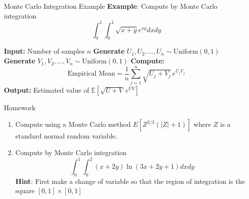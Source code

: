 \documentclass[8pt]{beamer}
\begin{document}
\begin{frame}[fragile]{Monte Carlo Integration Example}
\textbf{Example}: Compute by Monte Carlo integration 
\begin{equation*}
	\int_0^1 \int_0^1 \sqrt{x+y} e^{xy} dxdy
\end{equation*}

\begin{algorithm}[H]
\caption{Monte Carlo Estimator for $\mathbb{E}\!\left[\sqrt{U+V}\, e^{UV}\right]$}
\begin{algorithmic}[1]
  \State \textbf{Input:} Number of samples $n$
  \State \textbf{Generate} $U_1, U_2, \ldots, U_n \sim \text{Uniform}(0,1)$
  \State \textbf{Generate} $V_1, V_2, \ldots, V_n \sim \text{Uniform}(0,1)$
  \State \textbf{Compute:}
  \begin{equation*}
	\text{Empirical Mean} = \frac{1}{n} \sum_{j=1}^{n} \sqrt{U_j + V_j}\, e^{U_j V_j}
  \end{equation*}
  \State \textbf{Output:} Estimated value of $\mathbb{E}\!\left[\sqrt{U+V}\, e^{UV}\right]$
\end{algorithmic}
\end{algorithm}
\end{frame}

\begin{frame}{Homework}
\begin{enumerate}
	\item Compute using a Monte Carlo method $E\left[Z^{2/3}(|Z|+1)\right]$ where $Z$ is a standard normal random variable.
	\item Compute by Monte Carlo integration 
\begin{equation*}
	\int_0^1 \int_0^2 (x+2y) \ln (3x+2y+1) dx dy
\end{equation*}
\textbf{Hint}: First make a change of variable so that the region of integration is the square $[0,1]\times[0,1]$
\end{enumerate}
\end{frame}
\end{document}
